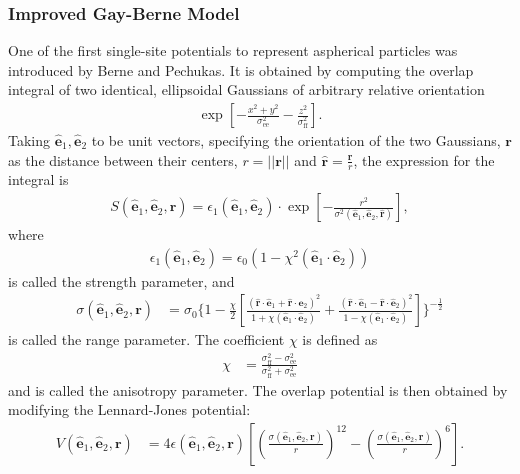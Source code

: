 \subsubsection{Improved Gay-Berne Model}
One of the first single-site potentials to represent aspherical particles was introduced by Berne and Pechukas\cite{gay1981modification}. It is obtained by computing the overlap integral of two identical, ellipsoidal Gaussians of arbitrary relative orientation
\begin{align}
 \exp\left\lbrack-\frac{x^2+y^2}{\sigma_{\text{ee}}^2}-\frac{z^2}{\sigma_{\text{ff}}^2}\right\rbrack.
\end{align}
Taking $\mathbf{\hat{e}}_1,\mathbf{\hat{e}}_2$ to be unit vectors, specifying the orientation of the two Gaussians, $\mathbf{r}$ as the distance between their centers, $r= ||\mathbf{r}||$ and $\mathbf{\hat{r}} = \frac{\mathbf{r}}{r}$, the expression for the integral is
\begin{align}
S(\mathbf{\hat{e}}_1,\mathbf{\hat{e}}_2,\mathbf{r}) = \epsilon_1(\mathbf{\hat{e}}_1,\mathbf{\hat{e}}_2)\cdot \exp\left\lbrack - \frac{r^2}{\sigma^2(\mathbf{\hat{e}}_1,\mathbf{\hat{e}}_2,\mathbf{\hat{r}})}\right\rbrack,
\end{align}
where
\begin{align}
\label{eq:strengthparameter}
    \epsilon_1(\mathbf{\hat{e}}_1,\mathbf{\hat{e}}_2) = \epsilon_0(1-\chi^2(\mathbf{\hat{e}}_1\cdot\mathbf{\hat{e}}_2))
\end{align}
is called the strength parameter, and
\begin{align} 
\label{eq:rangeparameter}
\sigma(\mathbf{\hat{e}}_1,\mathbf{\hat{e}}_2,\mathbf{r})&= \sigma_0 \Bigg\{ 1- \frac{\chi}{2}\left\lbrack \frac{(\mathbf{\hat{r}}\cdot\mathbf{\hat{e}}_1+\mathbf{\hat{r}}\cdot\mathbf{\hat{e}}_2)^2}{1+\chi(\mathbf{\hat{e}}_1\cdot\mathbf{\hat{e}}_2)}+\frac{(\mathbf{\hat{r}}\cdot\mathbf{\hat{e}}_1-\mathbf{\hat{r}}\cdot\mathbf{\hat{e}}_2)^2}{1-\chi(\mathbf{\hat{e}}_1\cdot\mathbf{\hat{e}}_2)}\right\rbrack\Bigg\}^{-\frac{1}{2}}
\end{align}
is called the range parameter. The coefficient $\chi$ is defined as
\begin{align}
\label{eq:anisotropyparameter}
    \chi &= \frac{\sigma_\text{ff}^2-\sigma_\text{ee}^2}{\sigma_\text{ff}^2+\sigma_\text{ee}^2}
\end{align}
and is called the anisotropy parameter. The overlap potential is then obtained by modifying the Lennard-Jones potential:
\begin{align}
    \label{eq:overlappotential}
    V(\mathbf{\hat{e}}_1,\mathbf{\hat{e}}_2,\mathbf{r}) &= 4\epsilon(\mathbf{\hat{e}}_1,\mathbf{\hat{e}}_2,\mathbf{r}) \left\lbrack \left(\frac{\sigma(\mathbf{\hat{e}}_1,\mathbf{\hat{e}}_2,\mathbf{r})}{r}\right)^{12}-\left(\frac{\sigma(\mathbf{\hat{e}}_1,\mathbf{\hat{e}}_2,\mathbf{r})}{r}\right)^{6} \right\rbrack.
\end{align}
